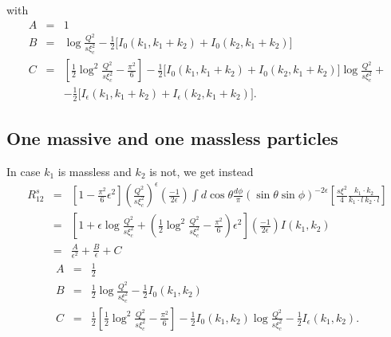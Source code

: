\documentclass[paper]{JHEP3}
\begin{document}
with
\begin{eqnarray}
  A & = & 1 \\
  B & = & \log \frac{Q^2}{s \xi_c^2} - \frac{1}{2} \big[ I_0 (k_1, k_1 + k_2)
  + I_0 (k_2, k_1 + k_2) \big] \\
  C & = & \left[ \frac{1}{2} \log^2 \frac{Q^2}{s \xi_c^2} - \frac{\pi^2}{6}
  \right] - \frac{1}{2} \big[ I_0 (k_1, k_1 + k_2) + I_0 (k_2, k_1 + k_2)
  \big] \log \frac{Q^2}{s \xi_c^2} + \nonumber\\
  &  & - \frac{1}{2} \big[ I_{\epsilon} (k_1, k_1 + k_2) + I_{\epsilon}
  (k_2, k_1 + k_2) \big] . 
\end{eqnarray}


\subsection{One massive and one massless particles}
In case $k_1$ is massless and $k_2$ is not, we get instead
\begin{eqnarray}
  R^s_{12} & = & \left[ 1 - \frac{\pi^2}{6} \epsilon^2 \right] \left(
  \frac{Q^2}{s \xi_c^2} \right)^{\epsilon} \left( \frac{- 1}{2 \epsilon}
  \right) \int d \cos \theta \frac{d \phi}{\pi} (\sin \theta \sin \phi)^{- 2
  \epsilon}  \left[ \frac{s \xi^2}{4} \frac{k_1 \cdot k_2}{k_1 \cdot l\ k_2
  \cdot l} \right] \nonumber\\
  & = & \left[ 1 + \epsilon \log \frac{Q^2}{s \xi_c^2} + \left( \frac{1}{2}
  \log^2 \frac{Q^2}{s \xi_c^2} - \frac{\pi^2}{6} \right) \epsilon^2 \right]
  \left( \frac{- 1}{2 \epsilon} \right) I (k_1, k_2) \nonumber\\
  & = & \frac{A}{\epsilon^2} + \frac{B}{\epsilon} + C 
\end{eqnarray}
\begin{eqnarray}
  A & = & \frac{1}{2} \\
  B & = & \frac{1}{2} \log \frac{Q^2}{s \xi_c^2} - \frac{1}{2} I_0 (k_1, k_2)
  \\
  C & = & \frac{1}{2} \left[\frac{1}{2} \log^2 \frac{Q^2}{s \xi_c^2} -
  \frac{\pi^2}{6} 
  \right] - \frac{1}{2} I_0 (k_1, k_2) \log \frac{Q^2}{s \xi_c^2} -
  \frac{1}{2} I_{\epsilon} (k_1, k_2) . 
\end{eqnarray}
\end{document}
